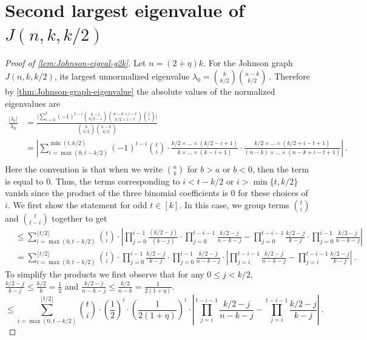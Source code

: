 \documentclass[10pt,a4paper]{article}
\newcommand{\prettyref}[1]{\cref{#1}}
\theoremstyle{definition}
\theoremstyle{remark}
\newcommand{\abs}[1]{\lvert#1\rvert}
\newcommand{\set}[1]{\{#1\}}
\renewcommand{\le}{\leqslant}
\numberwithin{equation}{section}
\let\pref=\prettyref
\newcommand{\fl}[1]{\lfloor #1 \rfloor}
\begin{document}
\section[Second largest eigenvalue of J(n,k,k/2)]{Second largest eigenvalue of $J(n,k,k/2)$}
 \label{app:proofs-of-Johnson-lambda2}
\begin{proof}[Proof of \pref{lem:Johnson-eigval-g2k}]
    Let $n= (2+\eta)k$. For the Johnson graph $J(n,k,k/2)$, its largest unnormalized eigenvalue
    $\lambda_0 = \binom{k}{k/2} \binom{n-k}{k/2}~.$
    Therefore by \pref{thm:Johnson-graph-eigenvalue} the absolute values of the normalized eigenvalues are 
    \begin{align*}
        \frac{\abs{\lambda_t}}{\lambda_0} 
        &= \frac{\abs{\sum_{i=0}^t (-1)^{t-i} \binom{k-i}{k/2-i} \binom{n-k+i-t}{k/2+i-t}\binom{t}{i}}}{\binom{k}{k/2} \binom{n-k}{k/2}}   \\
        &= \left| \sum_{i=\max(0,t-k/2)}^{\min(t,k/2)} (-1)^{t-i} \binom{t}{i} \cdot \frac{k/2\times \dots \times (k/2-i+1)}{k\times\dots\times (k-i+1)} \cdot \frac{k/2\times \dots \times (k/2+i-t+1)}{(n-k)\times\dots\times (n-k+i-t+1)}  \right| ~.\\
    \end{align*}
    Here the convention is that when we write \(\binom{a}{b}\) for \(b>a\) or \(b<0\), then the term is equal to \(0\). Thus, the terms corresponding to $i< t-k/2$ or $i>\min\set{t,k/2}$ vanish since the product of the three binomial coefficients is $0$ for these choices of $i$. We first show the statement for odd $t\in[k]$. In this case, we group terms $\binom{t}{i}$ and $\binom{t}{t-i}$ together to get 
    \begin{align*}
        &\le \sum_{i=\max(0,t-k/2)}^{\fl{t/2}} \binom{t}{i}\cdot \left|  \prod_{j=0}^{i-1} \frac{ (k/2-j)}{(k-j)} \cdot \prod_{j=0}^{t-i-1} \frac{  k/2-j}{ n-k-j}   -    \prod_{j=0}^{t-i-1}\frac{ k/2-j}{k-j} \cdot \prod_{j=0}^{i-1}\frac{  k/2-j}{n-k-j}  \right| \\
        &= \sum_{i=\max(0,t-k/2)}^{\fl{t/2}} \binom{t}{i}  \cdot    \prod_{j=0}^{i-1}\frac{ k/2-j}{k-j} \cdot \prod_{j=0}^{i-1} \frac{ k/2-j}{n-k-j}  \cdot \left| \prod_{j=i}^{t-i-1}\frac{k/2-j}{ n-k-j} - \prod_{j=i}^{t-i-1} \frac{k/2-j}{k-j} \right| ~.
    \end{align*}
    To simplify the products we first observe that for any $0\le j < k/2 $, $\frac{k/2-j}{k-j} \le \frac{k/2}{k} = \frac{1}{2}$ and $\frac{k/2-j}{n-k-j} \le \frac{k/2}{n-k} = \frac{1}{2(1+\eta)}$.
    \begin{equation}\label{eq:e1}
        \le \sum_{i=\max(0,t-k/2)}^{\fl{t/2}} \binom{t}{i}   \cdot \left(\frac{1}{2}\right)^{i}  \cdot \left(\frac{1}{2(1+\eta)}\right)^{i} \cdot \left| \prod_{j=i}^{t-i-1}\frac{k/2-j}{ n-k-j} - \prod_{j=i}^{t-i-1} \frac{k/2-j}{k-j} \right| ~.
    \end{equation}
    

\end{proof}
\end{document}
